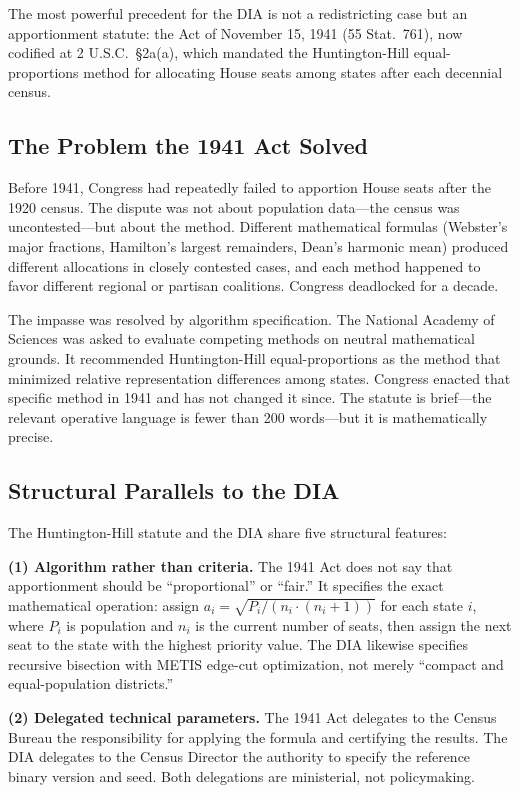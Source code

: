 The most powerful precedent for the DIA is not a redistricting case but an apportionment statute: the Act of November 15, 1941 (55 Stat.\ 761), now codified at 2 U.S.C.\ \S2a(a), which mandated the Huntington-Hill equal-proportions method for allocating House seats among states after each decennial census.

\subsection{The Problem the 1941 Act Solved}

Before 1941, Congress had repeatedly failed to apportion House seats after the 1920 census. The dispute was not about population data---the census was uncontested---but about the method. Different mathematical formulas (Webster's major fractions, Hamilton's largest remainders, Dean's harmonic mean) produced different allocations in closely contested cases, and each method happened to favor different regional or partisan coalitions. Congress deadlocked for a decade.

The impasse was resolved by algorithm specification. The National Academy of Sciences was asked to evaluate competing methods on neutral mathematical grounds. It recommended Huntington-Hill equal-proportions as the method that minimized relative representation differences among states. Congress enacted that specific method in 1941 and has not changed it since. The statute is brief---the relevant operative language is fewer than 200 words---but it is mathematically precise.

\subsection{Structural Parallels to the DIA}

The Huntington-Hill statute and the DIA share five structural features:

\textbf{(1) Algorithm rather than criteria.} The 1941 Act does not say that apportionment should be ``proportional'' or ``fair.'' It specifies the exact mathematical operation: assign $a_i = \sqrt{P_i / (n_i \cdot (n_i + 1))}$ for each state $i$, where $P_i$ is population and $n_i$ is the current number of seats, then assign the next seat to the state with the highest priority value. The DIA likewise specifies recursive bisection with METIS edge-cut optimization, not merely ``compact and equal-population districts.''

\textbf{(2) Delegated technical parameters.} The 1941 Act delegates to the Census Bureau the responsibility for applying the formula and certifying the results. The DIA delegates to the Census Director the authority to specify the reference binary version and seed. Both delegations are ministerial, not policymaking.

